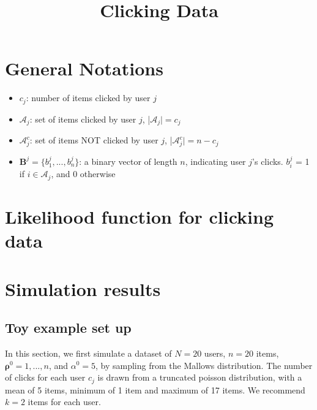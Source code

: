 \documentclass[11pt, oneside]{article}   	%
\title{Clicking Data}
\author{}
\date{}							%
\begin{document}
\maketitle
\section{General Notations}

\begin{itemize}
	
	\item {$c_j$: number of items clicked by user $j$}
	\item {$\mathcal{A}_j$: set of items clicked by user $j$, |$\mathcal{A}_j| = c_j$}
	\item {$\mathcal{A}_j^c$: set of items NOT clicked by user $j$, |$\mathcal{A}_j^c| = n-c_j$ }
	\item {$\bm{B}^j = \{b^j_1, ..., b^j_n\}$: a binary vector of length $n$, indicating user $j$'s clicks. $b^j_i$ = 1 if $i \in \mathcal{A}_j$, and 0 otherwise}
	
\end{itemize}
\section{Likelihood function for clicking data}
\section{Simulation results}
\subsection{Toy example set up}
In this section, we first simulate a dataset of $N = 20$ users, $n = 20$ items, $\bm{\rho}^0 = 1, ..., n$, and $\alpha^0 = 5$, by sampling from the Mallows distribution. The number of clicks for each user $c_j$ is drawn from a truncated poisson distribution, with a mean of 5 items, minimum of 1 item and maximum of 17 items. We recommend $ k = 2$ items for each user.  
\end{document}
